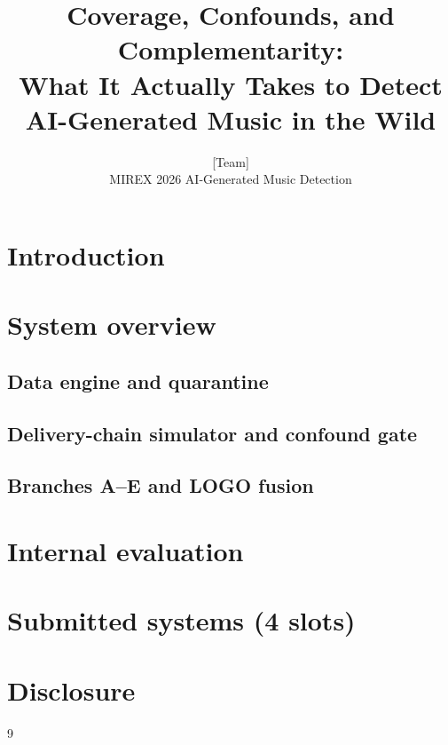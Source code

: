 \documentclass{article}
\title{Coverage, Confounds, and Complementarity:\\
       What It Actually Takes to Detect AI-Generated Music in the Wild}
\author{[Team] \\ MIREX 2026 AI-Generated Music Detection}
\date{}
\begin{document}
\maketitle

\begin{abstract}
\end{abstract}

\section{Introduction}
\section{System overview}
\subsection{Data engine and quarantine}
\subsection{Delivery-chain simulator and confound gate}
\subsection{Branches A--E and LOGO fusion}
\section{Internal evaluation}
\section{Submitted systems (4 slots)}
\section{Disclosure}


\begin{thebibliography}{9}
\end{thebibliography}
\end{document}
